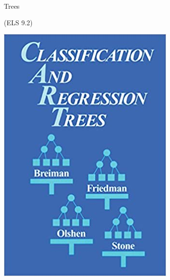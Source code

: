 \documentclass[
  ignorenonframetext,
]{beamer}
\begin{document}
\begin{frame}{Trees}
\protect\hypertarget{trees}{}

(ELS 9.2)

\includegraphics[width=0.25\linewidth]{./cart}

\end{frame}
\end{document}
